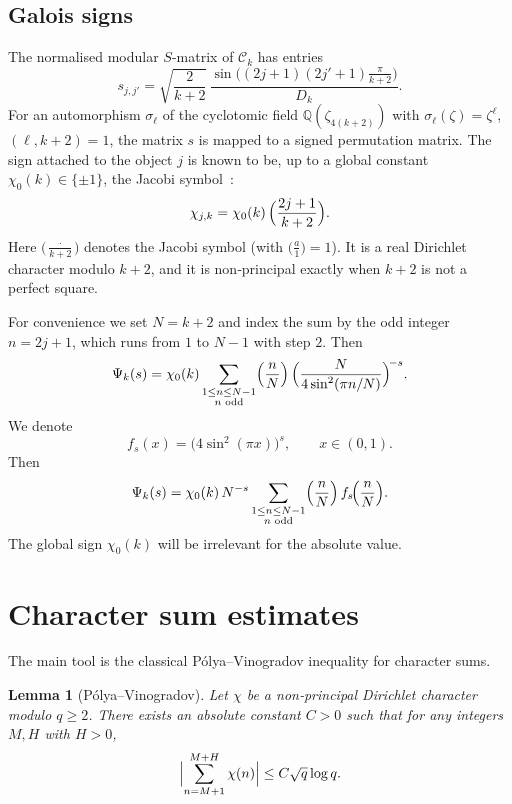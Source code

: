 \documentclass[11pt,a4paper]{article}
\newtheorem{lemma}[theorem]{Lemma}
\theoremstyle{definition}
\theoremstyle{remark}
\begin{document}
\subsection{Galois signs}
The normalised modular $S$-matrix of $\mathcal{C}_k$ has entries
\[
s_{j,j'}= \sqrt{\frac{2}{k+2}}\,
          \frac{\sin\bigl((2j+1)(2j'+1)\frac{\pi}{k+2}\bigr)}{D_k}.
\]
For an automorphism $\sigma_\ell$ of the cyclotomic field $\mathbb Q(\zeta_{4(k+2)})$
with $\sigma_\ell(\zeta)=\zeta^\ell$, $(\ell,k+2)=1$, the matrix $s$ is mapped to a signed
permutation matrix.  The sign attached to the object $j$ is known to be, up to a global
constant $\chi_0(k)\in\{\pm1\}$, the Jacobi symbol~\cite{huang}:
\begin{equation}\label{eq:chi}
\chi_{j,k}= \chi_0(k)\,\Bigl(\frac{2j+1}{k+2}\Bigr).
\end{equation}
Here $\bigl(\frac{\cdot}{k+2}\bigr)$ denotes the Jacobi symbol (with $\bigl(\frac{a}{1}\bigr)=1$).
It is a real Dirichlet character modulo $k+2$, and it is non‑principal exactly when $k+2$ is not
a perfect square.

For convenience we set $N=k+2$ and index the sum by the odd integer $n=2j+1$, which runs from
$1$ to $N-1$ with step $2$.  Then
\begin{equation}\label{eq:Psi-n}
\Psi_k(s)=\chi_0(k)\sum_{\substack{1\le n\le N-1\\ n\text{ odd}}}
           \Bigl(\frac{n}{N}\Bigr)\,
           \Bigl(\frac{N}{4\sin^2(\pi n/N)}\Bigr)^{\!-s}.
\end{equation}
We denote
\[
f_s(x)=\bigl(4\sin^2(\pi x)\bigr)^{s},\qquad x\in(0,1).
\]
Then
\[
\Psi_k(s)=\chi_0(k)\,N^{-s}\sum_{\substack{1\le n\le N-1\\ n\text{ odd}}}
           \Bigl(\frac{n}{N}\Bigr)\,f_s\!\Bigl(\frac{n}{N}\Bigr).
\]
The global sign $\chi_0(k)$ will be irrelevant for the absolute value.

\section{Character sum estimates}

The main tool is the classical P\'olya--Vinogradov inequality for character sums.

\begin{lemma}[P\'olya--Vinogradov]\label{lem:PV}
Let $\chi$ be a non‑principal Dirichlet character modulo $q\ge2$.
There exists an absolute constant $C>0$ such that for any integers $M,H$ with $H>0$,
\[
\Bigl|\sum_{n=M+1}^{M+H}\chi(n)\Bigr|\le C\sqrt{q}\log q .
\]
\end{lemma}
\end{document}
